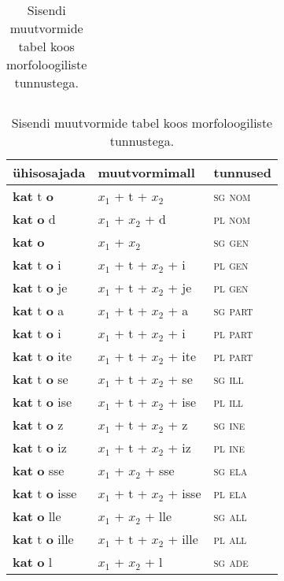 \documentclass[12pt,a4paper]{article}
\begin{document}
\begin{table}[H]
\begin{minipage}[t]{.40\textwidth}
\begin{tabular}[t]{l l}
    \end{tabular}
    \caption{Sisendi muutvormide tabel koos morfo\-loogiliste tunnustega.}
    \label{tab:sisendtabel_katto}
  \end{minipage}
  \hfill
  \begin{minipage}[t]{.55\textwidth}
    \centering
    \begin{tabular}[t]{l l l}
      ühisosajada                     & muutvormi\-mall           & tunnused \\
      \hline
      \textbf{kat} t \textbf{o}       & $x_1$ + t + $x_2$         & \textsc{sg nom} \\
      \textbf{kat}   \textbf{o} d     & $x_1$ + $x_2$ + d         & \textsc{pl nom} \\
      \textbf{kat}   \textbf{o}       & $x_1$ + $x_2$             & \textsc{sg gen} \\
      \textbf{kat} t \textbf{o} i     & $x_1$ + t + $x_2$ + i     & \textsc{pl gen} \\
      \textbf{kat} t \textbf{o} je    & $x_1$ + t + $x_2$ + je    & \textsc{pl gen} \\
      \textbf{kat} t \textbf{o} a     & $x_1$ + t + $x_2$ + a     & \textsc{sg part} \\
      \textbf{kat} t \textbf{o} i     & $x_1$ + t + $x_2$ + i     & \textsc{pl part} \\
      \textbf{kat} t \textbf{o} ite   & $x_1$ + t + $x_2$ + ite   & \textsc{pl part} \\
      \textbf{kat} t \textbf{o} se    & $x_1$ + t + $x_2$ + se    & \textsc{sg ill} \\
      \textbf{kat} t \textbf{o} ise   & $x_1$ + t + $x_2$ + ise   & \textsc{pl ill} \\
      \textbf{kat} t \textbf{o} z     & $x_1$ + t + $x_2$ + z     & \textsc{sg ine} \\
      \textbf{kat} t \textbf{o} iz    & $x_1$ + t + $x_2$ + iz    & \textsc{pl ine} \\
      \textbf{kat}   \textbf{o} sse   & $x_1$ + $x_2$ + sse       & \textsc{sg ela} \\
      \textbf{kat} t \textbf{o} isse  & $x_1$ + t + $x_2$ + isse  & \textsc{pl ela} \\
      \textbf{kat}   \textbf{o} lle   & $x_1$ + $x_2$ + lle       & \textsc{sg all} \\
      \textbf{kat} t \textbf{o} ille  & $x_1$ + t + $x_2$ + ille  & \textsc{pl all} \\
      \textbf{kat}   \textbf{o} l     & $x_1$ + $x_2$ + l         & \textsc{sg ade} \\

\end{tabular}
\end{minipage}
\end{table}
\end{document}
